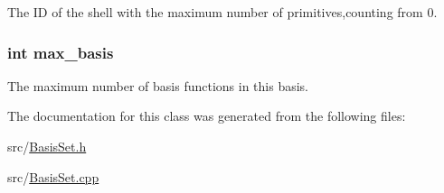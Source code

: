 The ID of the shell with the maximum number of primitives,counting from 0. \hypertarget{classJKBuilder_1_1BasisSet_af29e85e56ea63952fc7a1ede8d10426f}{
\subsubsection[{max\_\-basis}]{\setlength{\rightskip}{0pt plus 5cm}int {\bf max\_\-basis}}}
\label{classJKBuilder_1_1BasisSet_af29e85e56ea63952fc7a1ede8d10426f}


The maximum number of basis functions in this basis. 

The documentation for this class was generated from the following files:\begin{DoxyCompactItemize}
\item 
src/\hyperlink{BasisSet_8h}{BasisSet.h}\item 
src/\hyperlink{BasisSet_8cpp}{BasisSet.cpp}\end{DoxyCompactItemize}
